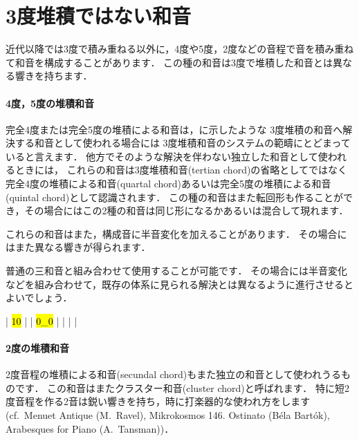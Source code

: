 \documentclass[dvipdfmx,uplatex,b5paper,openany,jbase=12Q,nomag*,textwidth-limit=44%
               ]{gachimuchi}
\begin{document}
\section{3度堆積ではない和音}
近代以降では3度で積み重ねる以外に，4度や5度，2度などの音程で音を積み重ねて和音を構成することがあります．
この種の和音は3度で堆積した和音とは異なる響きを持ちます．

\paragraph{4度，5度の堆積和音}
完全4度または完全5度の堆積による和音は，に示したような
3度堆積の和音へ解決する和音として使われる場合には
3度堆積和音のシステムの範疇にとどまっていると言えます．
他方でそのような解決を伴わない独立した和音として使われるときには，
これらの和音は3度堆積和音(tertian chord)の省略としてではなく
完全4度の堆積による和音(quartal chord)あるいは完全5度の堆積による和音(quintal chord)として認識されます．
この種の和音はまた転回形も作ることができ，その場合にはこの2種の和音は同じ形になるかあるいは混合して現れます．

\begin{Music}[0.6\linewidth]
  \nostartrule%
  \Startpiece%
  \Notes%
  \en\doublebar%
  \Notes%
  \en\doublebar%
  \Notes%
  \en\setdoublebar%
  \endpiece%
\end{Music}

これらの和音はまた，構成音に半音変化を加えることがあります．
その場合にはまた異なる響きが得られます．

普通の三和音と組み合わせて使用することが可能です．
その場合には半音変化などを組み合わせて，既存の体系に見られる解決とは異なるように進行させるとよいでしょう．
\begin{Music}[0.6\linewidth]
  \generalmeter{\meterC}%
  \Startpiece%
  \NOTes%
  |%
  \hl{1}\hl{0}%
  \en\bar%
  \NOTes%
  |%
  \hl{0}\hl{_0}%
  \en\bar%
  \NOTes%
  |%
  \en\bar%
  \NOTEs%
  |%
  \en\setdoublebar%
  \endpiece%
\end{Music}


\paragraph{2度の堆積和音}
2度音程の堆積による和音(secundal chord)もまた独立の和音として使われうるものです．
この和音はまたクラスター和音(cluster chord)と呼ばれます．
特に短2度音程を作る2音は鋭い響きを持ち，時に打楽器的な使われ方をします
(cf.\ Menuet Antique (M.~Ravel), Mikrokosmos 146. Ostinato (Béla Bartók), Arabesques for Piano (A.~Tansman))．
\end{document}
